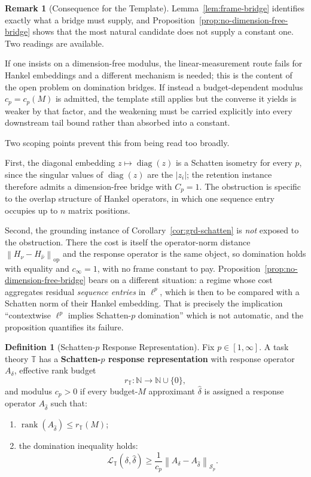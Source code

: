 \documentclass[12pt]{article}
\theoremstyle{definition}
\newtheorem{definition}[theorem]{Definition}
\newtheorem{remark}[theorem]{Remark}
\DeclareMathOperator{\rank}{rank}
\newcommand{\norm}[1]{\left\lVert#1\right\rVert}
\newcommand{\Sp}[1]{\mathcal S_{#1}}
\begin{document}
\begin{remark}[Consequence for the Template]
\label{rem:bridge-consequence}
Lemma~\ref{lem:frame-bridge} identifies exactly what a bridge must supply, and
Proposition~\ref{prop:no-dimension-free-bridge} shows that the most natural
candidate does not supply a constant one.  Two readings are available.

If one insists on a dimension-free modulus, the linear-measurement route fails
for Hankel embeddings and a different mechanism is needed; this is the content
of the open problem on domination bridges.  If instead a budget-dependent
modulus $c_p=c_p(M)$ is admitted, the template still applies but the converse it
yields is weaker by that factor, and the weakening must be carried explicitly
into every downstream tail bound rather than absorbed into a constant.

Two scoping points prevent this from being read too broadly.

First, the diagonal embedding $z\mapsto\operatorname{diag}(z)$ is a Schatten
isometry for every $p$, since the singular values of $\operatorname{diag}(z)$
are the $|z_i|$; the retention instance therefore admits a dimension-free
bridge with $C_p=1$.  The obstruction is specific to the overlap structure of
Hankel operators, in which one sequence entry occupies up to $n$ matrix
positions.

Second, the grounding instance of Corollary~\ref{cor:grd-schatten} is
\emph{not} exposed to the obstruction.  There the cost is itself the
operator-norm distance $\norm{H_\nu-H_{\widehat\nu}}_{\mathrm{op}}$ and the
response operator is the same object, so domination holds with equality and
$c_\infty=1$, with no frame constant to pay.
Proposition~\ref{prop:no-dimension-free-bridge} bears on a different
situation: a regime whose cost aggregates residual \emph{sequence entries} in
$\ell^p$, which is then to be compared with a Schatten norm of their Hankel
embedding.  That is precisely the implication ``contextwise $\ell^p$ implies
Schatten-$p$ domination'' which is not automatic, and the proposition
quantifies its failure.
\end{remark}

\begin{definition}[Schatten-$p$ Response Representation]
\label{def:response}
Fix $p\in[1,\infty]$.  A task theory $\mathbb T$ has a
\textbf{Schatten-$p$ response representation} with response operator
$A_\delta$, effective rank budget
\[
r_{\mathbb T}:\mathbb N\to\mathbb N\cup\{0\},
\]
and modulus $c_p>0$ if every budget-$M$ approximant $\widehat\delta$ is
assigned a response operator $A_{\widehat\delta}$ such that:
\begin{enumerate}[label=(\alph*)]
\item $\rank(A_{\widehat\delta})\le r_{\mathbb T}(M)$;
\item the domination inequality holds:
\[
\mathcal L_{\mathbb T}(\delta,\widehat\delta)
\ge
\frac1{c_p}
\norm{A_\delta-A_{\widehat\delta}}_{\Sp{p}}.
\]
\end{enumerate}
\end{definition}
\end{document}
